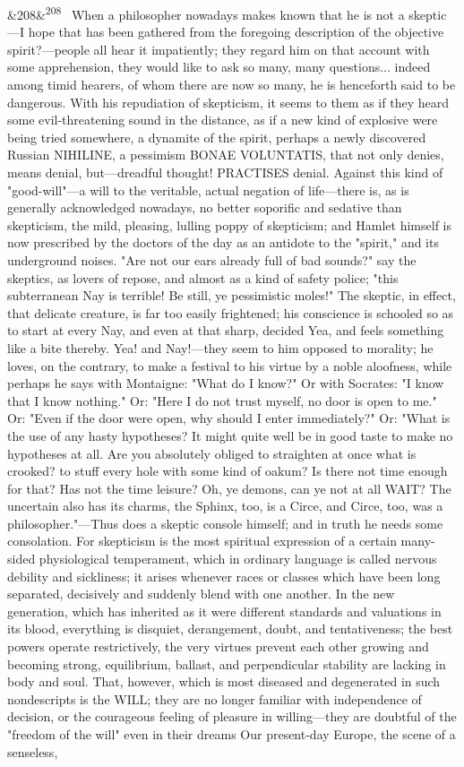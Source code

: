 \documentclass[12pt]{article}
\newcommand{\para}[1][]{\par\noindent\ifx&#1&\else\textsuperscript{\footnotesize #1}~\fi}
\begin{document}
\para[208] When a philosopher nowadays makes known that he is not a skeptic---I hope that has been gathered from the foregoing description of the objective spirit?---people all hear it impatiently; they regard him on that account with some apprehension, they would like to ask so many, many questions... indeed among timid hearers, of whom there are now so many, he is henceforth said to be dangerous. With his repudiation of skepticism, it seems to them as if they heard some evil-threatening sound in the distance, as if a new kind of explosive were being tried somewhere, a dynamite of the spirit, perhaps a newly discovered Russian NIHILINE, a pessimism BONAE VOLUNTATIS, that not only denies, means denial, but---dreadful thought! PRACTISES denial. Against this kind of "good-will"---a will to the veritable, actual negation of life---there is, as is generally acknowledged nowadays, no better soporific and sedative than skepticism, the mild, pleasing, lulling poppy of skepticism; and Hamlet himself is now prescribed by the doctors of the day as an antidote to the "spirit," and its underground noises. "Are not our ears already full of bad sounds?" say the skeptics, as lovers of repose, and almost as a kind of safety police; "this subterranean Nay is terrible! Be still, ye pessimistic moles!" The skeptic, in effect, that delicate creature, is far too easily frightened; his conscience is schooled so as to start at every Nay, and even at that sharp, decided Yea, and feels something like a bite thereby. Yea! and Nay!---they seem to him opposed to morality; he loves, on the contrary, to make a festival to his virtue by a noble aloofness, while perhaps he says with Montaigne: "What do I know?" Or with Socrates: "I know that I know nothing." Or: "Here I do not trust myself, no door is open to me." Or: "Even if the door were open, why should I enter immediately?" Or: "What is the use of any hasty hypotheses? It might quite well be in good taste to make no hypotheses at all. Are you absolutely obliged to straighten at once what is crooked? to stuff every hole with some kind of oakum? Is there not time enough for that? Has not the time leisure? Oh, ye demons, can ye not at all WAIT? The uncertain also has its charms, the Sphinx, too, is a Circe, and Circe, too, was a philosopher."---Thus does a skeptic console himself; and in truth he needs some consolation. For skepticism is the most spiritual expression of a certain many-sided physiological temperament, which in ordinary language is called nervous debility and sickliness; it arises whenever races or classes which have been long separated, decisively and suddenly blend with one another. In the new generation, which has inherited as it were different standards and valuations in its blood, everything is disquiet, derangement, doubt, and tentativeness; the best powers operate restrictively, the very virtues prevent each other growing and becoming strong, equilibrium, ballast, and perpendicular stability are lacking in body and soul. That, however, which is most diseased and degenerated in such nondescripts is the WILL; they are no longer familiar with independence of decision, or the courageous feeling of pleasure in willing---they are doubtful of the "freedom of the will" even in their dreams Our present-day Europe, the scene of a senseless, 
\end{document}
